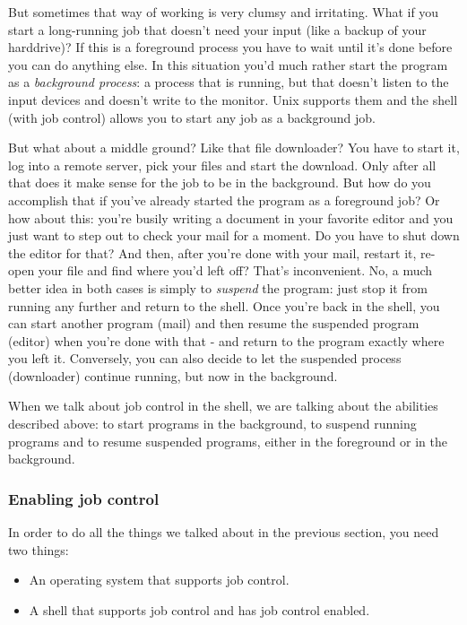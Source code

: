 But sometimes that way of working is very clumsy and irritating. What if you
start a long-running job that doesn't need your input (like a backup of your
harddrive)? If this is a foreground process you have to wait until it's done
before you can do anything else. In this situation you'd much rather start the
program as a \textit{background process}: a process that is running, but that
doesn't listen to the input devices and doesn't write to the monitor. Unix
supports them and the shell (with job control) allows you to start any job as a
background job.

But what about a middle ground? Like that file downloader? You have to start
it, log into a remote server, pick your files and start the download. Only
after all that does it make sense for the job to be in the background. But how
do you accomplish that if you've already started the program as a foreground
job? Or how about this: you're busily writing a document in your favorite
editor and you just want to step out to check your mail for a moment. Do you
have to shut down the editor for that? And then, after you're done with your
mail, restart it, re-open your file and find where you'd left off? That's
inconvenient. No, a much better idea in both cases is simply to
\textit{suspend} the program: just stop it from running any further and return
to the shell. Once you're back in the shell, you can start another program
(mail) and then resume the suspended program (editor) when you're done with
that - and return to the program exactly where you left it. Conversely, you can
also decide to let the suspended process (downloader) continue running, but now
in the background.

When we talk about job control in the shell, we are talking about the abilities
described above: to start programs in the background, to suspend running
programs and to resume suspended programs, either in the foreground or in the
background.

\subsubsection{Enabling job control}
In order to do all the things we talked about in the previous section, you need
two things:

\begin{itemize}
\item An operating system that supports job control.
\item A shell that supports job control and has job control enabled.
\end{itemize}

